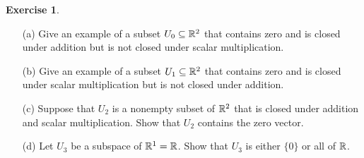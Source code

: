 \documentclass[a4paper]{amsart}
\theoremstyle{definition}
\newtheorem{exercise}{Exercise}
\begin{document}
\begin{exercise}\label{ex-subspace-iii}
 \begin{itemize}
  \item[(a)] Give an example of a subset $U_0\subseteq{\mathbb{R}}^2$ that contains
   zero and is closed under addition but is not closed under scalar
   multiplication.
  \item[(b)] Give an example of a subset $U_1\subseteq{\mathbb{R}}^2$ that contains
   zero and is closed under scalar multiplication but is not closed
   under addition.
  \item[(c)] Suppose that $U_2$ is a nonempty subset of ${\mathbb{R}}^2$ that is
   closed under addition and scalar multiplication.  Show that $U_2$
   contains the zero vector.
  \item[(d)] Let $U_3$ be a subspace of ${\mathbb{R}}^1={\mathbb{R}}$.  Show that $U_3$ is
   either $\{0\}$ or all of ${\mathbb{R}}$.
 \end{itemize}
\end{exercise}
\end{document}
